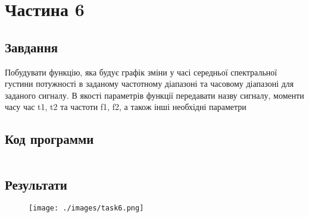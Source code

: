 \section{Частина 6}
\label{sec:task6}

\subsection{Завдання}
\label{subsec:task6_task}

Побудувати функцію, яка будує графік зміни у часі середньої
спектральної густини потужності в заданому частотному діапазоні та часовому
діапазоні для заданого сигналу. В якості параметрів функції
передавати назву сигналу, моменти часу час t1, t2 та частоти f1, f2, а також інші
необхідні параметри

\subsection{Код программи}
\label{subsec:task6_code}
\inputminted{python}{../src/task6.py}

\subsection{Результати}
\label{subsec:task6_results}

\begin{figure}[!ht]
    \centering
    \texttt{[image: ./images/task6.png]}
\end{figure}
